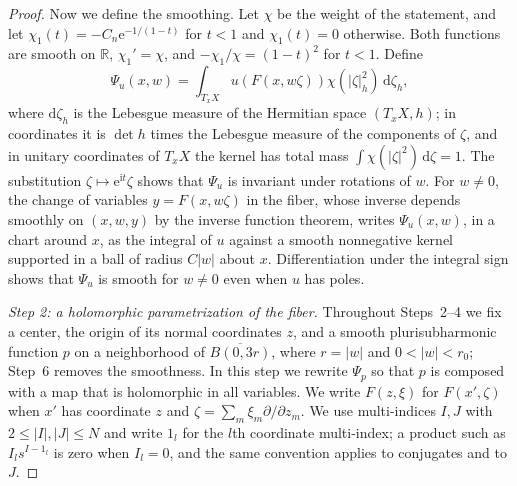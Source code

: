 \begin{proof}
Now we define the smoothing. Let $\chi$ be the weight of the statement, and let $\chi_1(t)=-C_n\mathrm e^{-1/(1-t)}$ for $t<1$ and $\chi_1(t)=0$ otherwise. Both functions are smooth on $\mathbb R$, $\chi_1'=\chi$, and $-\chi_1/\chi=(1-t)^2$ for $t<1$. Define
\[
 \Psi_u(x,w)=\int_{T_xX}u(F(x,w\zeta))
                       \chi(|\zeta|_h^2)\,\mathrm d\zeta_h,
\]
where $\mathrm d\zeta_h$ is the Lebesgue measure of the Hermitian space $(T_xX,h)$; in coordinates it is $\det h$ times the Lebesgue measure of the components of $\zeta$, and in unitary coordinates of $T_xX$ the kernel has total mass $\int\chi(|\zeta|^2)\,\mathrm d\zeta=1$. The substitution $\zeta\mapsto\mathrm e^{\mathrm it}\zeta$ shows that $\Psi_u$ is invariant under rotations of $w$. For $w\neq0$, the change of variables $y=F(x,w\zeta)$ in the fiber, whose inverse depends smoothly on $(x,w,y)$ by the inverse function theorem, writes $\Psi_u(x,w)$, in a chart around $x$, as the integral of $u$ against a smooth nonnegative kernel supported in a ball of radius $C|w|$ about $x$. Differentiation under the integral sign shows that $\Psi_u$ is smooth for $w\neq0$ even when $u$ has poles.

\emph{Step 2: a holomorphic parametrization of the fiber.} Throughout Steps~2--4 we fix a center, the origin of its normal coordinates $z$, and a smooth plurisubharmonic function $p$ on a neighborhood of $\overline{B(0,3r)}$, where $r=|w|$ and $0<|w|<r_0$; Step~6 removes the smoothness. In this step we rewrite $\Psi_p$ so that $p$ is composed with a map that is holomorphic in all variables. We write $F(z,\xi)$ for $F(x',\zeta)$ when $x'$ has coordinate $z$ and $\zeta=\sum_m\xi_m\partial/\partial z_m$. We use multi-indices $I,J$ with $2\leq|I|,|J|\leq N$ and write $1_l$ for the $l$th coordinate multi-index; a product such as $I_ls^{I-1_l}$ is zero when $I_l=0$, and the same convention applies to conjugates and to $J$.


\end{proof}

